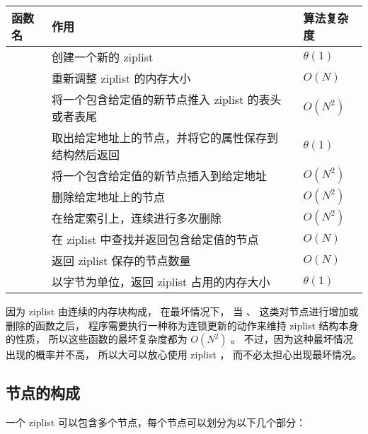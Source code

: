 \documentclass[a4paper,11pt,english]{sphinxmanual}
\begin{document}
\begin{tabulary}{\linewidth}{|p{4cm}|p{8.5cm}|L|}
\hline
\textbf{
函数名
} & \textbf{
作用
} & \textbf{
算法复杂度
}\\\hline

 & 
创建一个新的 ziplist
 & 
$\theta(1)$
\\\hline

 & 
重新调整 ziplist 的内存大小
 & 
$O(N)$
\\\hline

 & 
将一个包含给定值的新节点推入 ziplist 的表头或者表尾
 & 
$O(N^2)$
\\\hline

 & 
取出给定地址上的节点，并将它的属性保存到  结构然后返回
 & 
$\theta(1)$
\\\hline

 & 
将一个包含给定值的新节点插入到给定地址
 & 
$O(N^2)$
\\\hline

 & 
删除给定地址上的节点
 & 
$O(N^2)$
\\\hline

 & 
在给定索引上，连续进行多次删除
 & 
$O(N^2)$
\\\hline

 & 
在 ziplist 中查找并返回包含给定值的节点
 & 
$O(N)$
\\\hline

 & 
返回 ziplist 保存的节点数量
 & 
$O(N)$
\\\hline

 & 
以字节为单位，返回 ziplist 占用的内存大小
 & 
$\theta(1)$
\\\hline
\end{tabulary}


因为 ziplist 由连续的内存块构成，
在最坏情况下，
当  、  这类对节点进行增加或删除的函数之后，
程序需要执行一种称为连锁更新的动作来维持 ziplist 结构本身的性质，
所以这些函数的最坏复杂度都为 $O(N^2)$ 。
不过，因为这种最坏情况出现的概率并不高，
所以大可以放心使用 ziplist ，
而不必太担心出现最坏情况。


\subsection{节点的构成}
\label{compress-datastruct/ziplist:id2}
一个 ziplist 可以包含多个节点，每个节点可以划分为以下几个部分：
\end{document}
